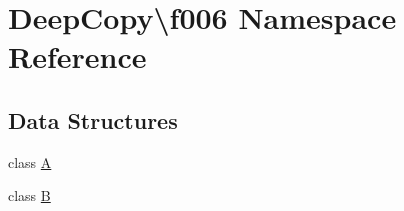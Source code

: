 \hypertarget{namespace_deep_copy_1_1f006}{}\section{Deep\+Copy\textbackslash{}f006 Namespace Reference}
\label{namespace_deep_copy_1_1f006}
\subsection*{Data Structures}
\begin{DoxyCompactItemize}
\item 
class \mbox{\hyperlink{class_deep_copy_1_1f006_1_1_a}{A}}
\item 
class \mbox{\hyperlink{class_deep_copy_1_1f006_1_1_b}{B}}
\end{DoxyCompactItemize}
